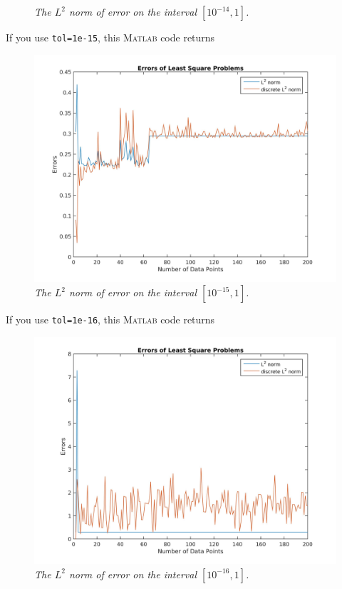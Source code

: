 \documentclass[a4paper,oneside]{book}
\numberwithin{equation}{chapter}
\begin{document}
\begin{enumerate}
\begin{figure}[H]
	\caption{\textit{The $L^2$ norm of error on the interval $\left[10^{-14},1\right]$.}}
\end{figure}
If you use \texttt{tol=1e-15}, this \textsc{Matlab} code returns
\begin{figure}[H]
	\centering
	\includegraphics[scale=0.14]{4}
	\caption{\textit{The $L^2$ norm of error on the interval $\left[10^{-15},1\right]$.}}
\end{figure}
If you use \texttt{tol=1e-16}, this \textsc{Matlab} code returns
\begin{figure}[H]
	\centering
	\includegraphics[scale=0.14]{5}
	\caption{\textit{The $L^2$ norm of error on the interval $\left[10^{-16},1\right]$.}}
\end{figure}
\end{enumerate}
\end{document}
